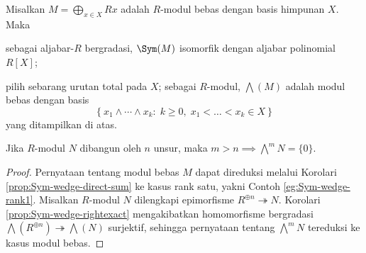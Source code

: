 \begin{corollary}\label{prop:Sym-wedge-free}
	Misalkan $M = \bigoplus_{x \in X} Rx$ adalah $R$-modul bebas dengan basis himpunan $X$. Maka
	\begin{compactitem}
		\item sebagai aljabar-$R$ bergradasi, $\Sym(M)$ isomorfik dengan aljabar polinomial $R[X]$;
		\item pilih sebarang urutan total pada $X$; sebagai $R$-modul, $\bigwedge(M)$ adalah modul bebas dengan basis
		\[ \left\{ x_1 \wedge \cdots \wedge x_k : \; k \geq 0, \; x_1 < \ldots < x_k \in X \right\} \]
		yang ditampilkan di atas.
	\end{compactitem}
	Jika $R$-modul $N$ dibangun oleh $n$ unsur, maka $m > n \implies \bigwedge^m N = \{0\}$.
\end{corollary}
\begin{proof}
	Pernyataan tentang modul bebas $M$ dapat direduksi melalui Korolari \ref{prop:Sym-wedge-direct-sum} ke kasus rank satu, yakni Contoh \ref{eg:Sym-wedge-rank1}. Misalkan $R$-modul $N$ dilengkapi epimorfisme $R^{\oplus n} \twoheadrightarrow N$. Korolari \ref{prop:Sym-wedge-rightexact} mengakibatkan homomorfisme bergradasi $\bigwedge(R^{\oplus n}) \twoheadrightarrow \bigwedge(N)$ surjektif, sehingga pernyataan tentang $\bigwedge^m N$ tereduksi ke kasus modul bebas.
\end{proof}


